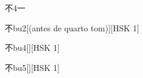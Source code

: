 \begin{entry}{不}{4}{⼀}
  \begin{phonetics}{不}{bu2}[(antes de quarto tom)][HSK 1]
  \end{phonetics}
  \begin{phonetics}{不}{bu4}[][HSK 1]
  \end{phonetics}
  \begin{phonetics}{不}{bu5}[][HSK 1]
  \end{phonetics}
\end{entry}
